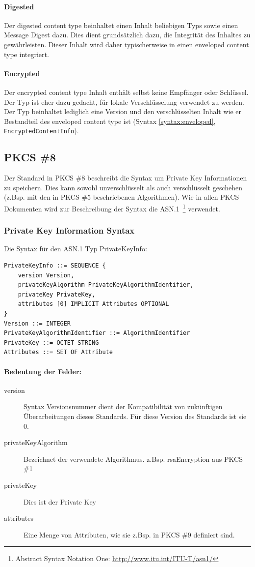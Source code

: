 \documentclass[10pt,a4paper]{article}
\begin{document}
\paragraph{Digested}
Der digested content type beinhaltet einen Inhalt beliebigen Typs sowie einen Message
Digest dazu. Dies dient grundsätzlich dazu, die Integrität des Inhaltes zu gewährleisten.
Dieser Inhalt wird daher typischerweise in einen enveloped content type integriert.

\paragraph{Encrypted}
Der encrypted content type Inhalt enthält selbst keine Empfänger oder Schlüssel. Der Typ
ist eher dazu gedacht, für lokale Verschlüsselung verwendet zu werden. Der Typ beinhaltet
lediglich eine Version und den verschlüsselten Inhalt wie er Bestandteil des enveloped
content type ist (Syntax \ref{syntax:enveloped}, \texttt{EncryptedContentInfo}).

\subsection{PKCS \#8}
Der Standard in PKCS \#8 beschreibt die Syntax um Private Key Informationen zu speichern.
Dies kann sowohl unverschlüsselt als auch verschlüsselt geschehen (z.Bsp. mit den in PKCS
\#5 beschriebenen Algorithmen). Wie in allen PKCS Dokumenten wird zur Beschreibung der
Syntax die ASN.1~\footnote{Abstract Syntax Notation One:
\url{http://www.itu.int/ITU-T/asn1/}} verwendet.

\subsubsection{Private Key Information Syntax}
Die Syntax für den ASN.1 Typ PrivateKeyInfo:
\begin{verbatim}
PrivateKeyInfo ::= SEQUENCE {
    version Version,
    privateKeyAlgorithm PrivateKeyAlgorithmIdentifier,
    privateKey PrivateKey,
    attributes [0] IMPLICIT Attributes OPTIONAL
}
Version ::= INTEGER
PrivateKeyAlgorithmIdentifier ::= AlgorithmIdentifier
PrivateKey ::= OCTET STRING
Attributes ::= SET OF Attribute
\end{verbatim}

\paragraph{Bedeutung der Felder:}
\begin{description}
    \item[version] Syntax Versionsnummer dient der Kompatibilität von zukünftigen
        Überarbeitungen dieses Standards. Für diese Version des Standards ist sie 0.
    \item[privateKeyAlgorithm] Bezeichnet der verwendete Algorithmus. z.Bsp. rsaEncryption
        aus PKCS \#1
    \item[privateKey] Dies ist der Private Key
    \item[attributes] Eine Menge von Attributen, wie sie z.Bsp. in PKCS \#9 definiert
        sind.
\end{description}
\end{document}
